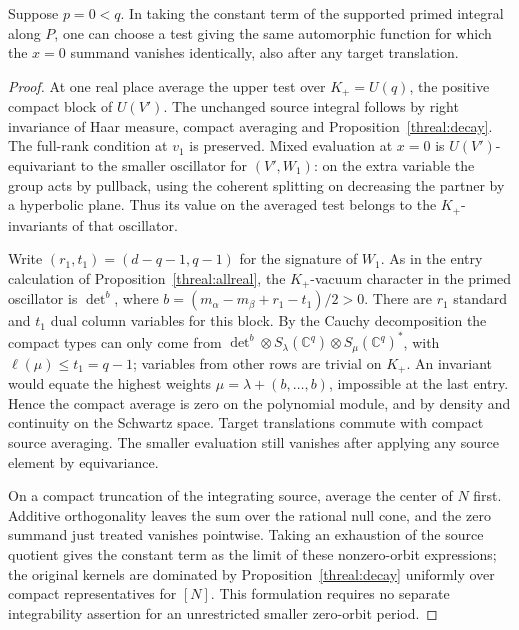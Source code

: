 \begin{lemma}\label{tpd:primezero}
Suppose \(p=0<q\). In taking the constant term of the supported
primed integral along \(P\), one can choose a test giving the same
automorphic function for which the \(x=0\) summand vanishes
identically, also after any target translation.
\end{lemma}
\begin{proof}
At one real place average the upper test over \(K_+=U(q)\), the
positive compact block of \(U(V')\). The unchanged source integral
follows by right invariance of Haar measure, compact averaging and
Proposition~\ref{threal:decay}. The full-rank condition at \(v_1\)
is preserved. Mixed evaluation at \(x=0\) is \(U(V')\)-equivariant
to the smaller oscillator for \((V',W_1)\): on the extra variable
the group acts by pullback, using the coherent splitting on decreasing
the partner by a hyperbolic plane. Thus its value on the averaged
test belongs to the \(K_+\)-invariants of that oscillator.

Write \((r_1,t_1)=(d-q-1,q-1)\) for the signature of \(W_1\).
As in the entry calculation of Proposition~\ref{threal:allreal},
the \(K_+\)-vacuum character in the primed oscillator is
\(\det^{b}\), where \(b=(m_\alpha-m_\beta+r_1-t_1)/2>0\).
There are \(r_1\) standard and \(t_1\) dual column variables
for this block. By the Cauchy decomposition the compact types can
only come from
\(\det^b\otimes S_\lambda(\mathbb C^q)
                    \otimes S_\mu(\mathbb C^q)^*\),
with \(\ell(\mu)\leq t_1=q-1\); variables from other rows are
trivial on \(K_+\). An invariant would equate the highest weights
\(\mu=\lambda+(b,\ldots,b)\), impossible at the last entry.
Hence the compact average is zero on the polynomial module, and
by density and continuity on the Schwartz space. Target translations
commute with compact source averaging. The smaller evaluation still
vanishes after applying any source element by equivariance.

On a compact truncation of the integrating source, average the
center of \(N\) first. Additive orthogonality leaves the sum over
the rational null cone, and the zero summand just treated vanishes
pointwise. Taking an exhaustion of the source quotient gives the
constant term as the limit of these nonzero-orbit expressions;
the original kernels are dominated by Proposition~\ref{threal:decay}
uniformly over compact representatives for \([N]\). This formulation
requires no separate integrability assertion for an unrestricted
smaller zero-orbit period.
\end{proof}

